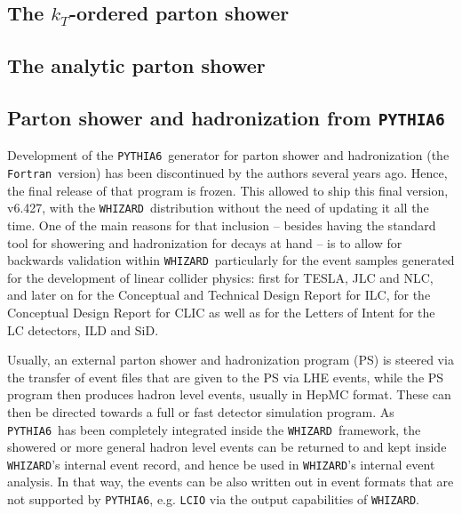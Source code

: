 \documentclass[12pt]{book}
\newcommand{\ttt}[1]{\texttt{#1}}
\newcommand{\whizard}{\ttt{WHIZARD}}
\newcommand{\pythiasix}{\ttt{PYTHIA6}}
\newcommand{\fortran}{\ttt{Fortran}}
\begin{document}

\subsection{The $k_T$-ordered parton shower}
\label{sec:ktordered}


\subsection{The analytic parton shower}
\label{sec:analytic}


\subsection{Parton shower and hadronization from \pythiasix}
\label{sec:pythia6}

Development of the \pythiasix\ generator for parton shower and
hadronization (the \fortran\ version) has been discontinued by the
authors several years ago. Hence, the final release of that program is
frozen. This allowed to ship this final version, v6.427, with the
\whizard\ distribution without the need of updating it all the
time. One of the main reasons for that inclusion -- besides having the
standard tool for showering and hadronization for decays at hand -- is
to allow for backwards validation within \whizard\ particularly for
the event samples generated for the development of linear collider
physics: first for TESLA, JLC and NLC, and later on for the Conceptual
and Technical Design Report for ILC, for the Conceptual Design Report
for CLIC as well as for the Letters of Intent for the LC detectors,
ILD and SiD.

Usually, an external parton shower and hadronization program (PS) is
steered via the transfer of event files that are given to the PS via
LHE events, while the PS program then produces hadron level events,
usually in HepMC format. These can then be directed towards a full or
fast detector simulation program. As \pythiasix\ has been completely
integrated inside the \whizard\ framework, the showered or more
general hadron level events can be returned to and kept inside
\whizard's internal event record, and hence be used in \whizard's
internal event analysis. In that way, the events can be also written
out in event formats that are not supported by \pythiasix,
e.g. \ttt{LCIO} via the output capabilities of \whizard.
\end{document}
